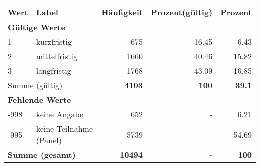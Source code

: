      \begin{longtable}{lXrrr}
     \toprule
     \textbf{Wert} & \textbf{Label} & \textbf{Häufigkeit} & \textbf{Prozent(gültig)} & \textbf{Prozent} \\
     \endhead
     \midrule
     \multicolumn{5}{l}{\textbf{Gültige Werte}}\\

     1 &
     \multicolumn{1}{X}{ kurzfristig   } &


       \num{675} &
       \num[round-mode=places,round-precision=2]{16,45} &
         \num[round-mode=places,round-precision=2]{6,43} \\

     2 &
     \multicolumn{1}{X}{ mittelfristig   } &


       \num{1660} &
       \num[round-mode=places,round-precision=2]{40,46} &
         \num[round-mode=places,round-precision=2]{15,82} \\

     3 &
     \multicolumn{1}{X}{ langfristig   } &


       \num{1768} &
       \num[round-mode=places,round-precision=2]{43,09} &
         \num[round-mode=places,round-precision=2]{16,85} \\
     \midrule
     \multicolumn{2}{l}{Summe (gültig)} &
       \textbf{\num{4103}} &
     \textbf{100} &
       \textbf{\num[round-mode=places,round-precision=2]{39,1}} \\
     \multicolumn{5}{l}{\textbf{Fehlende Werte}}\\
       -998 &
       keine Angabe &
         \num{652} &
        - &
         \num[round-mode=places,round-precision=2]{6,21} \\
       -995 &
       keine Teilnahme (Panel) &
         \num{5739} &
        - &
         \num[round-mode=places,round-precision=2]{54,69} \\
     \midrule
     \multicolumn{2}{l}{\textbf{Summe (gesamt)}} &
          \textbf{\num{10494}} &
        \textbf{-} &
        \textbf{100} \\
     \bottomrule
     \end{longtable}
     
